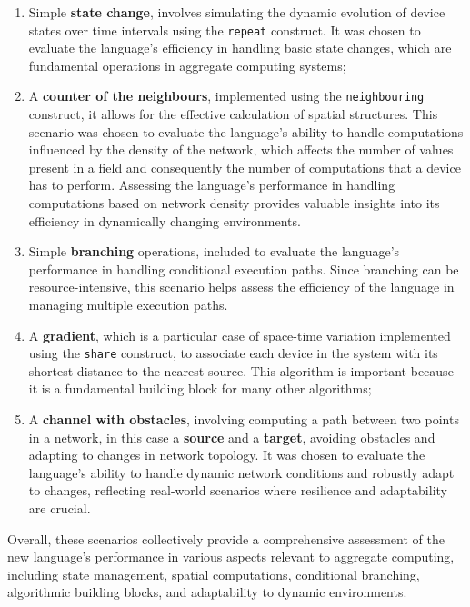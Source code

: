 \begin{enumerate}
    \item Simple \textbf{state change}, involves simulating the dynamic evolution of device states over time intervals
        using the \texttt{repeat} construct.
        It was chosen to evaluate the language's efficiency in handling basic state changes, which are fundamental
        operations in aggregate computing systems;
    \item A \textbf{counter of the neighbours}, implemented using the \texttt{neighbouring} construct, it allows for the
        effective calculation of spatial structures.
        This scenario was chosen to evaluate the language's ability to handle computations influenced by the density
        of the network, which affects the number of values present in a field and consequently the number of computations
        that a device has to perform.
        Assessing the language's performance in handling computations based on network density provides valuable insights into
        its efficiency in dynamically changing environments.
    \item Simple \textbf{branching} operations, included to evaluate the language's performance in handling conditional execution paths.
        Since branching can be resource-intensive, this scenario helps assess the efficiency of the language in managing
        multiple execution paths.
    \item A \textbf{gradient}, which is a particular case of space-time variation implemented using the \texttt{share}
        construct, to associate each device in the system with its shortest distance to the nearest source.
        This algorithm is important because it is a fundamental building block for many other algorithms;
    \item A \textbf{channel with obstacles}, involving computing a path between two points in a network, in this case a
        \textbf{source} and a \textbf{target}, avoiding obstacles and adapting to changes in network topology.
        It was chosen to evaluate the language's ability to handle dynamic network conditions and robustly adapt to
        changes, reflecting real-world scenarios where resilience and adaptability are crucial.
\end{enumerate}

Overall, these scenarios collectively provide a comprehensive assessment of the new language's performance in various aspects
relevant to aggregate computing, including state management, spatial computations, conditional branching, algorithmic
building blocks, and adaptability to dynamic environments.

